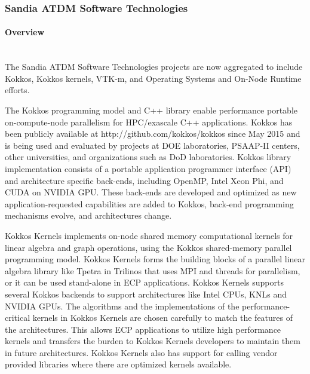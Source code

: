 \subsubsection{ Sandia ATDM Software Technologies}

\paragraph{Overview} \leavevmode \\

The Sandia ATDM Software Technologies projects are now aggregated to include Kokkos, Kokkos kernels, VTK-m, and Operating Systems and On-Node Runtime efforts. 

The Kokkos programming model and C++ library enable performance portable on-compute-node parallelism for HPC/exascale C++ applications. Kokkos has been publicly available at http://github.com/kokkos/kokkos since May 2015 and is being used and evaluated by projects at DOE laboratories, PSAAP-II centers, other universities, and organizations such as DoD laboratories. Kokkos library implementation consists of a portable application programmer interface (API) and architecture specific back-ends, including OpenMP, Intel Xeon Phi, and CUDA on NVIDIA GPU. These back-ends are developed and optimized as new application-requested capabilities are added to Kokkos, back-end programming mechanisms evolve, and architectures change.

Kokkos Kernels implements on-node shared memory computational kernels for linear algebra and graph operations, using the Kokkos shared-memory parallel programming model. Kokkos Kernels forms the building blocks of a parallel linear algebra library like Tpetra in Trilinos that uses MPI and threads for parallelism, or it can be used stand-alone in ECP applications. Kokkos Kernels supports several Kokkos backends to support architectures like Intel CPUs, KNLs and NVIDIA GPUs. The algorithms and the implementations of the performance-critical kernels in Kokkos Kernels are chosen carefully to match the features of the architectures. This allows ECP applications to utilize high performance kernels and transfers the burden to Kokkos Kernels developers to maintain them in future architectures. Kokkos Kernels also has support for calling vendor provided libraries where there are optimized kernels available.

